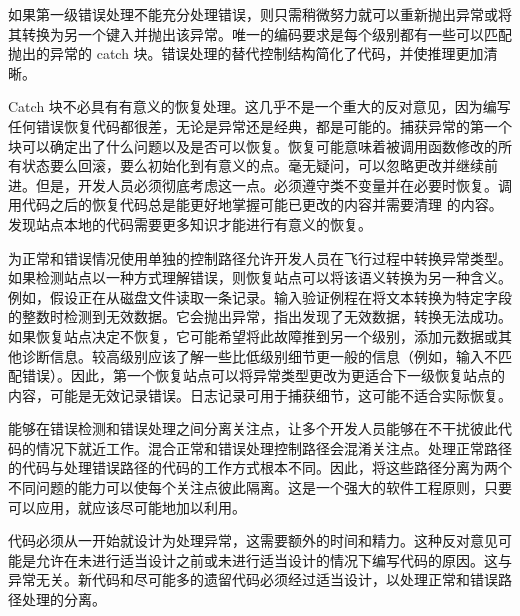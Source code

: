 如果第一级错误处理不能充分处理错误，则只需稍微努力就可以重新抛出异常或将其转换为另一个键入并抛出该异常。唯一的编码要求是每个级别都有一些可以匹配抛出的异常的 catch 块。错误处理的替代控制结构简化了代码，并使推理更加清晰。


Catch 块不必具有有意义的恢复处理。这几乎不是一个重大的反对意见，因为编写任何错误恢复代码都很差，无论是异常还是经典，都是可能的。捕获异常的第一个块可以确定出了什么问题以及是否可以恢复。恢复可能意味着被调用函数修改的所有状态要么回滚，要么初始化到有意义的点。毫无疑问，可以忽略更改并继续前进。但是，开发人员必须彻底考虑这一点。必须遵守类不变量并在必要时恢复。调用代码之后的恢复代码总是能更好地掌握可能已更改的内容并需要清理 的内容。发现站点本地的代码需要更多知识才能进行有意义的恢复。


为正常和错误情况使用单独的控制路径允许开发人员在飞行过程中转换异常类型。如果检测站点以一种方式理解错误，则恢复站点可以将该语义转换为另一种含义。例如，假设正在从磁盘文件读取一条记录。输入验证例程在将文本转换为特定字段的整数时检测到无效数据。它会抛出异常，指出发现了无效数据，转换无法成功。如果恢复站点决定不恢复，它可能希望将此故障推到另一个级别，添加元数据或其他诊断信息。较高级别应该了解一些比低级别细节更一般的信息（例如，输入不匹配错误）。因此，第一个恢复站点可以将异常类型更改为更适合下一级恢复站点的内容，可能是无效记录错误。日志记录可用于捕获细节，这可能不适合实际恢复。


能够在错误检测和错误处理之间分离关注点，让多个开发人员能够在不干扰彼此代码的情况下就近工作。混合正常和错误处理控制路径会混淆关注点。处理正常路径的代码与处理错误路径的代码的工作方式根本不同。因此，将这些路径分离为两个不同问题的能力可以使每个关注点彼此隔离。这是一个强大的软件工程原则，只要可以应用，就应该尽可能地加以利用。


代码必须从一开始就设计为处理异常，这需要额外的时间和精力。这种反对意见可能是允许在未进行适当设计之前或未进行适当设计的情况下编写代码的原因。这与异常无关。新代码和尽可能多的遗留代码必须经过适当设计，以处理正常和错误路径处理的分离。
